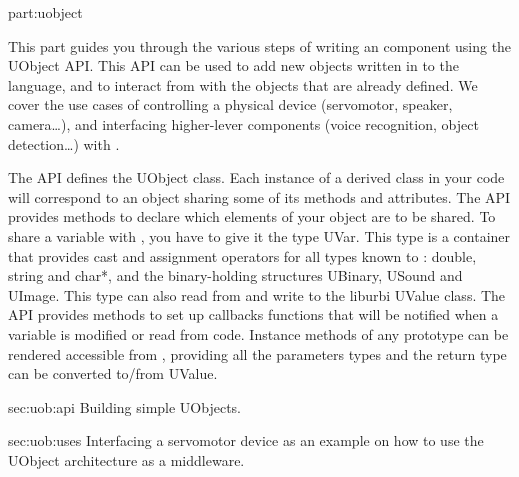 \begin{partDescription}{part:uobject}
  {
    This part guides you through the various steps of writing an \urbi
    \Cxx component using the UObject API. This API can be used to add
    new objects written in \Cxx to the \us language, and to interact
    from \Cxx with the objects that are already defined. We cover the
    use cases of controlling a physical device (servomotor, speaker,
    camera\ldots), and interfacing higher-lever components (voice
    recognition, object detection\ldots) with \urbi.

    The API defines the UObject class. Each instance of a derived
    class in your \Cxx code will correspond to an \us object sharing
    some of its methods and attributes. The API provides methods to
    declare which elements of your object are to be shared. To share a
    variable with \urbi, you have to give it the type UVar. This type
    is a container that provides cast and assignment operators for all
    types known to \urbi: double, string and char*, and the
    binary-holding structures UBinary, USound and UImage. This type
    can also read from and write to the liburbi UValue class. The API
    provides methods to set up callbacks functions that will be
    notified when a variable is modified or read from \urbi
    code. Instance methods of any prototype can be rendered accessible
    from \us, providing all the parameters types and the return type
    can be converted to/from UValue.
  }
\item[sec:uob:api]
  Building simple UObjects.
\item[sec:uob:uses]
  Interfacing a servomotor device as an example on how to use the
  UObject architecture as a middleware.
\end{partDescription}

